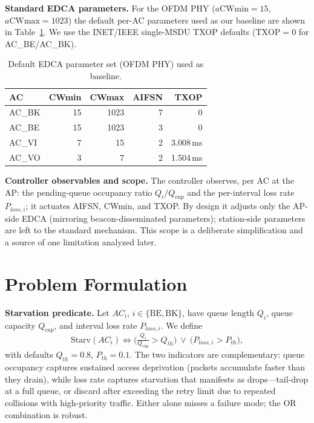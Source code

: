 \documentclass[conference]{IEEEtran}
\newcommand{\AC}[1]{AC\_#1}
\begin{document}
\textbf{Standard EDCA parameters.} For the OFDM PHY ($a\text{CWmin}=15$,
$a\text{CWmax}=1023$) the default per-AC parameters used as our baseline are
shown in Table~\ref{tab:edca}. We use the INET/IEEE single-MSDU TXOP defaults
($\text{TXOP}=0$ for \AC{BE}/\AC{BK}).

\begin{table}[t]
\centering
\caption{Default EDCA parameter set (OFDM PHY) used as baseline.}
\label{tab:edca}
\begin{tabular}{@{}lrrrr@{}}
\toprule
AC & CWmin & CWmax & AIFSN & TXOP\\
\midrule
\AC{BK} & 15 & 1023 & 7 & 0\\
\AC{BE} & 15 & 1023 & 3 & 0\\
\AC{VI} & 7  & 15   & 2 & 3.008\,ms\\
\AC{VO} & 3  & 7    & 2 & 1.504\,ms\\
\bottomrule
\end{tabular}
\end{table}

\textbf{Controller observables and scope.} The controller observes, per AC at
the AP: the pending-queue occupancy ratio $Q_i/Q_{cap}$ and the per-interval
loss rate $P_{loss,i}$; it actuates AIFSN, CWmin, and TXOP. By design it
adjusts only the AP-side EDCA (mirroring beacon-disseminated parameters);
station-side parameters are left to the standard mechanism. This scope is a
deliberate simplification and a source of one limitation analyzed later.

\section{Problem Formulation}\label{sec:problem}
\textbf{Starvation predicate.} Let $AC_i$, $i\in\{\text{BE},\text{BK}\}$, have
queue length $Q_i$, queue capacity $Q_{cap}$, and interval loss rate
$P_{loss,i}$. We define
\begin{equation}
\text{Starv}(AC_i)\iff\Big(\tfrac{Q_i}{Q_{cap}}>Q_{th}\Big)\ \lor\
\big(P_{loss,i}>P_{th}\big),
\label{eq:starv}
\end{equation}
with defaults $Q_{th}=0.8$, $P_{th}=0.1$. The two indicators are
complementary: queue occupancy captures sustained access deprivation (packets
accumulate faster than they drain), while loss rate captures starvation that
manifests as drops---tail-drop at a full queue, or discard after exceeding the
retry limit due to repeated collisions with high-priority traffic. Either
alone misses a failure mode; the OR combination is robust.
\end{document}
